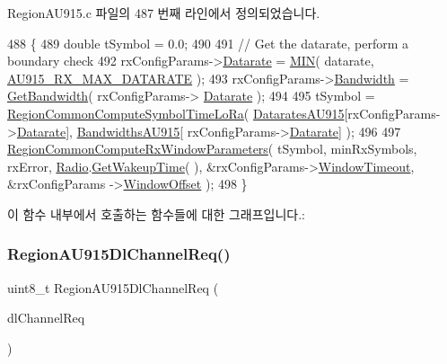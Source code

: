 Region\+A\+U915.\+c 파일의 487 번째 라인에서 정의되었습니다.


\begin{DoxyCode}
488 \{
489     \textcolor{keywordtype}{double} tSymbol = 0.0;
490 
491     \textcolor{comment}{// Get the datarate, perform a boundary check}
492     rxConfigParams->\mbox{\hyperlink{structs_rx_config_params_ae2f6080f3aa0e9485c55513ca56bb24d}{Datarate}} = \mbox{\hyperlink{utilities_8h_a3acffbd305ee72dcd4593c0d8af64a4f}{MIN}}( datarate, \mbox{\hyperlink{group___r_e_g_i_o_n_a_u915_ga5ce832bce671573a6b6bb4a8358b250e}{AU915\_RX\_MAX\_DATARATE}} );
493     rxConfigParams->\mbox{\hyperlink{structs_rx_config_params_aa8fc32e4883d30642e0ceb5845006a57}{Bandwidth}} = \mbox{\hyperlink{_region_a_u915_8c_afbe81e6d36760141722791d216d4ac60}{GetBandwidth}}( rxConfigParams->
      \mbox{\hyperlink{structs_rx_config_params_ae2f6080f3aa0e9485c55513ca56bb24d}{Datarate}} );
494 
495     tSymbol = \mbox{\hyperlink{group___r_e_g_i_o_n_c_o_m_m_o_n_ga79ed8b6555b68276d3c9ff2626b20fc8}{RegionCommonComputeSymbolTimeLoRa}}( 
      \mbox{\hyperlink{group___r_e_g_i_o_n_a_u915_gaf86f3852261cee915f4132bd35e6c188}{DataratesAU915}}[rxConfigParams->\mbox{\hyperlink{structs_rx_config_params_ae2f6080f3aa0e9485c55513ca56bb24d}{Datarate}}], \mbox{\hyperlink{group___r_e_g_i_o_n_a_u915_ga02efc5a531fde19a519564cc39dd9bff}{BandwidthsAU915}}[
      rxConfigParams->\mbox{\hyperlink{structs_rx_config_params_ae2f6080f3aa0e9485c55513ca56bb24d}{Datarate}}] );
496 
497     \mbox{\hyperlink{group___r_e_g_i_o_n_c_o_m_m_o_n_gaba7114d0ca01f04933710feb13646138}{RegionCommonComputeRxWindowParameters}}( tSymbol, minRxSymbols, 
      rxError, \mbox{\hyperlink{sx1276mb1las_8c_acf9fe61a72c16fa29a0dc449d23e3820}{Radio}}.\mbox{\hyperlink{struct_radio__s_aa6c05429af1a9f479d4720d95d0ee774}{GetWakeupTime}}( ), &rxConfigParams->\mbox{\hyperlink{structs_rx_config_params_a9d9f6c16ea62e2bcc09b100e2cb83e3f}{WindowTimeout}}, &rxConfigParams
      ->\mbox{\hyperlink{structs_rx_config_params_a9d092276960345e3b06ba105cf0c8b98}{WindowOffset}} );
498 \}
\end{DoxyCode}
이 함수 내부에서 호출하는 함수들에 대한 그래프입니다.\+:
\mbox{\label{group___r_e_g_i_o_n_a_u915_ga8568053064f5db87978653f9fd218177}} 
\subsubsection{\texorpdfstring{Region\+A\+U915\+Dl\+Channel\+Req()}{RegionAU915DlChannelReq()}}
{\footnotesize\ttfamily uint8\+\_\+t Region\+A\+U915\+Dl\+Channel\+Req (\begin{DoxyParamCaption}\item[{\mbox{\hyperlink{group___r_e_g_i_o_n_gae0d608ff1f8ea0a430e4f9a4c38ec7f3}{Dl\+Channel\+Req\+Params\+\_\+t}} $\ast$}]{dl\+Channel\+Req }\end{DoxyParamCaption})}



